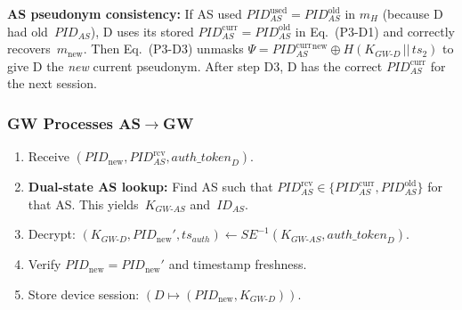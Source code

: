 \documentclass[12pt,a4paper]{article}
\newcommand{\IDas}{\mathit{ID}_{AS}}
\newcommand{\PIDnew}{\mathit{PID}_{\mathrm{new}}}
\newcommand{\PIDas}{\mathit{PID}_{AS}}
\newcommand{\PIDascurr}{\mathit{PID}_{AS}^{\mathrm{curr}}}
\newcommand{\PIDASOld}{\mathit{PID}_{AS}^{\mathrm{old}}}
\newcommand{\mnew}{m_{\mathrm{new}}}
\newcommand{\KGWd}{K_{GW\text{-}D}}
\newcommand{\KGWas}{K_{GW\text{-}AS}}
\newcommand{\authtoken}{\mathit{auth\_token}_D}
\newcommand{\SE}{\mathit{SE}}
\begin{document}
\begin{mdframed}[backgroundcolor=blue!5]
\textbf{AS pseudonym consistency:}
If AS used $\PIDas^{\mathrm{used}} = \PIDASOld$ in $m_H$ (because D
had old~$\PIDas$), D uses its stored $\PIDascurr = \PIDASOld$ in
Eq.~(P3-D1) and correctly recovers~$\mnew$.
Then Eq.~(P3-D3) unmasks $\Psi = \PIDascurr^{\mathrm{new}} \oplus
H(\KGWd \,||\, ts_2)$ to give D the \emph{new} current pseudonym.
After step D3, D has the correct $\PIDascurr$ for the next session.
\end{mdframed}

\subsubsection*{GW Processes AS$\to$GW}
\begin{enumerate}[label=\textbf{GW.\arabic*}]
  \item Receive $(\PIDnew, \PIDas^{\mathrm{rcv}}, \authtoken)$.
  \item \textbf{Dual-state AS lookup:}
        Find AS such that $\PIDas^{\mathrm{rcv}} \in
        \{\PIDascurr, \PIDASOld\}$ for that AS.
        This yields~$\KGWas$ and~$\IDas$.
  \item Decrypt: $(\KGWd, \PIDnew', ts_{\mathit{auth}}) \leftarrow
        \SE^{-1}(\KGWas, \authtoken)$.
  \item Verify $\PIDnew = \PIDnew'$ and timestamp freshness.
  \item Store device session: $(D \mapsto (\PIDnew, \KGWd))$.
\end{enumerate}
\end{document}

